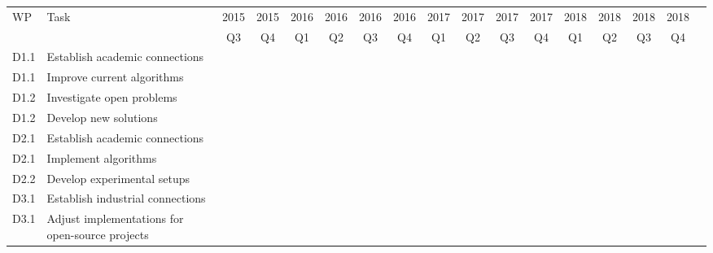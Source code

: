 \documentclass[a4paper,11pt]{article}
\begin{document}
\begin{landscape}
    \begin{tabularx}{\linewidth}{|lX|c|c|c|c|c|c|c|c|c|c|c|c|c|c|c|}
        \hline
        \multirow{2}{*}{WP} & \multirow{2}{*}{Task} & 2015 & 2015 & 2016 & 2016 & 2016 & 2016 & 2017 & 2017 & 2017 & 2017 & 2018 & 2018 & 2018 & 2018 \\
        & & Q3 & Q4 & Q1 & Q2 & Q3 & Q4 & Q1 & Q2 & Q3 & Q4 & Q1 & Q2 & Q3 & Q4 \\\hline
        D1.1 & Establish academic connections & \cellcolor[gray]{0.5} & \cellcolor[gray]{0.5} & & & & & & & & & & & & \\\hline
        D1.1 & Improve current algorithms & \cellcolor[gray]{0.5} & \cellcolor[gray]{0.5} & \cellcolor[gray]{0.5} & \cellcolor[gray]{0.5} & \cellcolor[gray]{0.5} & \cellcolor[gray]{0.5} \cellcolor[gray]{0.5} & \cellcolor[gray]{0.5} & \cellcolor[gray]{0.5} & \cellcolor[gray]{0.5} & & & & & \\\hline
        D1.2 & Investigate open problems & & & & & & \cellcolor[gray]{0.5} & \cellcolor[gray]{0.5} & & & & & & & \\\hline
        D1.2 & Develop new solutions & & & & & & & \cellcolor[gray]{0.5} & \cellcolor[gray]{0.5} & \cellcolor[gray]{0.5} & \cellcolor[gray]{0.5} & \cellcolor[gray]{0.5} & \cellcolor[gray]{0.5} & \cellcolor[gray]{0.5} & \cellcolor[gray]{0.5} \\\hline
        D2.1 & Establish academic connections & \cellcolor[gray]{0.5} & \cellcolor[gray]{0.5} & & & & & & & & & & & & \\\hline
        D2.1 & Implement algorithms & \cellcolor[gray]{0.5} & \cellcolor[gray]{0.5} & \cellcolor[gray]{0.5} & \cellcolor[gray]{0.5} & \cellcolor[gray]{0.5} & \cellcolor[gray]{0.5} & \cellcolor[gray]{0.5} & \cellcolor[gray]{0.5} & & & & & & \\\hline
        D2.2 & Develop experimental setups & & & & & \cellcolor[gray]{0.5} & \cellcolor[gray]{0.5} & \cellcolor[gray]{0.5} & \cellcolor[gray]{0.5} & \cellcolor[gray]{0.5} & \cellcolor[gray]{0.5} & & & & \\\hline
        D3.1 & Establish industrial connections & & & & & & & \cellcolor[gray]{0.5} & \cellcolor[gray]{0.5} & \cellcolor[gray]{0.5} & & & & & \\\hline
        D3.1 & Adjust implementations for open-source projects & & & & & & & & & \cellcolor[gray]{0.5} & \cellcolor[gray]{0.5} & \cellcolor[gray]{0.5} & \cellcolor[gray]{0.5} & \cellcolor[gray]{0.5} & \\\hline
    \end{tabularx}


\end{landscape}
\end{document}
